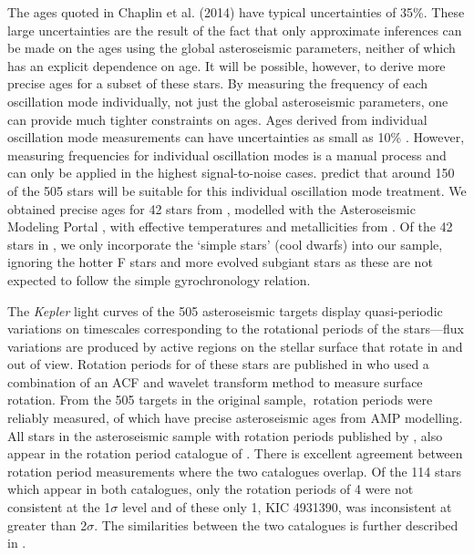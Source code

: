 The ages quoted in Chaplin et al. (2014) have typical uncertainties of 35\%.
These large uncertainties are the result of the fact that only approximate
inferences can be made on the ages using the global asteroseismic parameters,
neither of which has an explicit dependence on age.
It will be possible, however, to derive more precise ages for a subset of
these stars.
By measuring the frequency of each oscillation mode individually,
not just the global asteroseismic parameters, one can provide much tighter
constraints on ages.
Ages derived from individual oscillation mode measurements can have
uncertainties as small as 10\% \citep{Brown1994, SilvaAguirre2013}.
However, measuring frequencies for individual oscillation modes is a manual
process and can only be applied in the highest signal-to-noise cases.
\citet{Chaplin2014} predict that around 150 of the 505 stars will be suitable
for this individual oscillation mode treatment.
We obtained precise ages for 42 stars from \citet{Metcalfe2014}, modelled with
the Asteroseismic Modeling Portal \citep[AMP,][]{Woitaszek2010, Metcalfe2009},
with effective temperatures and metallicities from \citet{Bruntt2012}.
Of the 42 stars in \citet{Metcalfe2014}, we only incorporate the `simple
stars' (cool dwarfs) into our sample, ignoring the hotter F stars and more
evolved subgiant stars as these are not expected to follow the simple
gyrochronology relation.

The {\it Kepler} light curves of the 505 asteroseismic targets display
quasi-periodic variations on timescales corresponding to the rotational
periods of the stars---flux variations are produced by active regions on the
stellar surface that rotate in and out of view.
Rotation periods for \ngarcia of these stars are published in
\citet{Garcia2014} who used a combination of an ACF and wavelet transform
method to measure surface rotation.
From the 505 targets in the original sample, \nastero$~$rotation periods were
reliably measured, \nprecise of which have precise asteroseismic ages from AMP
modelling.
All stars in the asteroseismic sample with rotation periods published by
\citet{Mcquillan2014}, also appear in the rotation period catalogue of
\citet{Garcia2014}.
There is excellent agreement between rotation period
measurements where the two catalogues overlap.
Of the 114 stars which appear in both catalogues, only the rotation periods of
4 were not consistent at the 1$\sigma$ level and of these only 1, KIC 4931390,
was inconsistent at greater than 2$\sigma$.
The similarities between the two catalogues is further described in
\citet{Garcia2014}.  %

